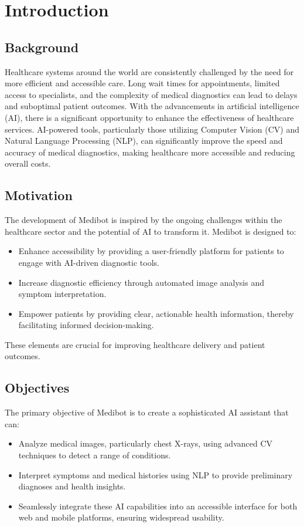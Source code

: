 

\chapter{Introduction}

\section{Background}
Healthcare systems around the world are consistently challenged by the need for more efficient and accessible care. Long wait times for appointments, limited access to specialists, and the complexity of medical diagnostics can lead to delays and suboptimal patient outcomes. With the advancements in artificial intelligence (AI), there is a significant opportunity to enhance the effectiveness of healthcare services. AI-powered tools, particularly those utilizing Computer Vision (CV) and Natural Language Processing (NLP), can significantly improve the speed and accuracy of medical diagnostics, making healthcare more accessible and reducing overall costs.

\section{Motivation}
The development of Medibot is inspired by the ongoing challenges within the healthcare sector and the potential of AI to transform it. Medibot is designed to:
\begin{itemize}
    \item Enhance accessibility by providing a user-friendly platform for patients to engage with AI-driven diagnostic tools.
    \item Increase diagnostic efficiency through automated image analysis and symptom interpretation.
    \item Empower patients by providing clear, actionable health information, thereby facilitating informed decision-making.
\end{itemize}
These elements are crucial for improving healthcare delivery and patient outcomes.

\section{Objectives}
The primary objective of Medibot is to create a sophisticated AI assistant that can:
\begin{itemize}
    \item Analyze medical images, particularly chest X-rays, using advanced CV techniques to detect a range of conditions.
    \item Interpret symptoms and medical histories using NLP to provide preliminary diagnoses and health insights.
    \item Seamlessly integrate these AI capabilities into an accessible interface for both web and mobile platforms, ensuring widespread usability.
\end{itemize}

